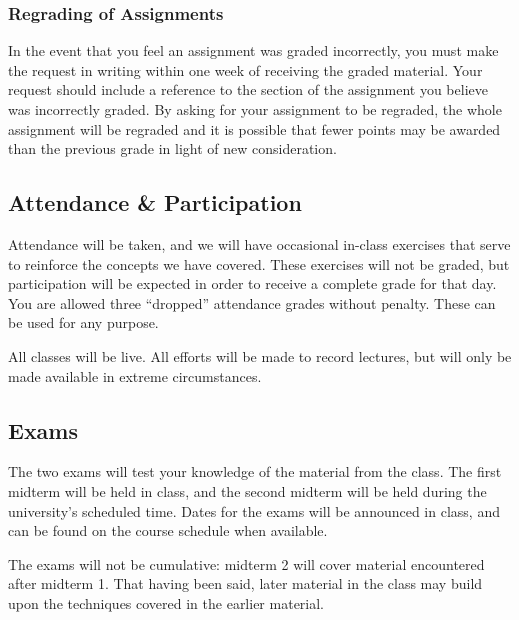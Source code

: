 \documentclass[12pt]{scrartcl}
\begin{document}
\subsubsection{Regrading of Assignments}
In the event that you feel an assignment was graded incorrectly, 
you must make the request in writing within one week of receiving the graded material.  
Your request should include a reference to the section of the assignment you believe was incorrectly graded.   
By asking for your assignment to be regraded, 
the whole assignment will be regraded and it is possible that fewer points 
may be awarded than the previous grade in light of new consideration.

\subsection{Attendance \& Participation}
Attendance will be taken, 
and we will have occasional in-class exercises that serve to reinforce the concepts we have covered. 
These exercises will not be graded, but participation will be expected in order to receive a complete grade for that day.
You are allowed three ``dropped'' attendance grades without penalty. 
These can be used for any purpose. 

All classes will be live.
All efforts will be made to record lectures, but will only be made available in extreme circumstances.

\subsection{Exams}
The two exams will test your knowledge of the material from the class. 
The first midterm will be held in class, and the second midterm will be held during the university’s scheduled time. 
Dates for the exams will be announced in class, and can be found on the course schedule when available.

The exams will not be cumulative: midterm 2 will cover material encountered after midterm 1. 
That having been said, later material in the class may build upon the techniques covered in the earlier material.







\end{document}
